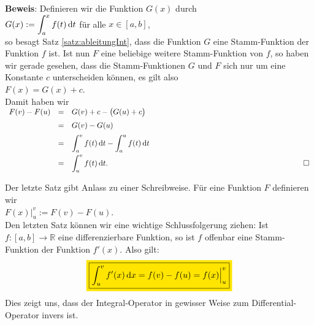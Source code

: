\noindent
\textbf{Beweis}: Definieren wir die Funktion $G(x)$ durch 
\\[0.2cm]
\hspace*{1.3cm}
$\displaystyle G(x) := \int_a^x f(t)\, \textrm{d} t$ \quad f\"ur alle $x\in[a,b]$,
\\[0.2cm]
so besagt Satz \ref{satz:ableitungInt}, dass die Funktion $G$ eine Stamm-Funktion der
Funktion $f$ ist.  Ist nun $F$ eine beliebige weitere Stamm-Funktion von $f$, so haben wir
gerade gesehen, dass die Stamm-Funktionen $G$ und $F$ sich nur um eine Konstante $c$
unterscheiden k\"onnen, es gilt also
\\[0.2cm]
\hspace*{1.3cm}
$F(x) = G(x) + c$.
\\[0.2cm]
Damit haben wir 
\\[0.2cm]
\hspace*{1.3cm}
$
\begin{array}[t]{lcl}
  F(v) - F(u) & = & G(v) + c - \bigl(G(u) + c\bigr) \\[0.2cm]
              & = & G(v) - G(u)                     \\[0.2cm]
              & = & \ds\int_a^v f(t)\, \dr t - \int_a^u f(t)\, \dr t \\[0.3cm]
              & = & \ds\int_u^v f(t)\, \dr t. \hspace*{9cm} \Box  
\end{array}
$
\vspace*{0.3cm}

\noindent
Der letzte Satz gibt Anlass zu einer Schreibweise.  F\"ur eine Funktion $F$  definieren wir
\\[0.2cm]
\hspace*{1.3cm}
$F(x) \Big|_u^v := F(v) - F(u)$.
\\[0.2cm]
Den letzten Satz k\"onnen wir eine wichtige Schlussfolgerung ziehen:  Ist $f:[a,b] \rightarrow\mathbb{R}$
eine differenzierbare Funktion, so ist $f$ offenbar eine Stamm-Funktion der Funktion $f'(x)$.
Also gilt:
\begin{equation}
  \label{eq:hauptsatzKorollar}
  \colorbox{orange}{\framebox{$\ds\int_u^v f'(x)\,\dr x = f(v) - f(u) = f(x)\Big|_u^v$}}
\end{equation}
Dies zeigt uns, dass der Integral-Operator in gewisser Weise zum Differential-Operator invers ist.

